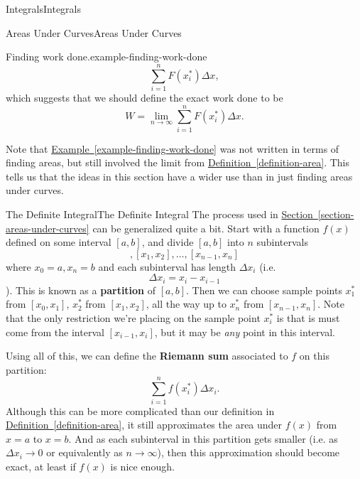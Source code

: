 \documentclass[10pt,]{book}
\newcommand{\terminology}[1]{\textbf{#1}}
\numberwithin{equation}{section}
\begin{document}
\begin{chapterptx}{Integrals}{}{Integrals}{}{}
\begin{sectionptx}{Areas Under Curves}{}{Areas Under Curves}{}{}
\begin{example}{Finding work done.}{example-finding-work-done}
\begin{equation*}
\sum_{i=1}^{n}F(x_{i}^{*})\Delta x,
\end{equation*}
which suggests that we should define the exact work done to be%
\begin{equation*}
W = \lim_{n\to\infty}\sum_{i=1}^{n}F(x_{i}^{*})\Delta x.
\end{equation*}
%
\end{example}
\hypertarget{p-424}{}%
Note that \hyperref[example-finding-work-done]{Example~\ref{example-finding-work-done}} was not written in terms of finding areas, but still involved the limit from \hyperref[definition-area]{Definition~\ref{definition-area}}. This tells us that the ideas in this section have a wider use than in just finding areas under curves.%
\end{sectionptx}
%
%
\typeout{************************************************}
\typeout{************************************************}
%
\begin{sectionptx}{The Definite Integral}{}{The Definite Integral}{}{}\label{section-the-definite-integral}
\hypertarget{p-425}{}%
The process used in \hyperref[section-areas-under-curves]{Section~\ref{section-areas-under-curves}} can be generalized quite a bit. Start with a function \(f(x)\) defined on some interval \([a,b]\), and divide \([a,b]\) into \(n\) subintervals%
\begin{equation*}
[x_{0},x_{1}], [x_{1},x_{2}],\ldots,[x_{n-1},x_{n}]
\end{equation*}
where \(x_{0} = a, x_{n} = b\) and each subinterval has length \(\Delta x_{i}\) (i.e.%
\begin{equation*}
\Delta x_{i} = x_{i} - x_{i-1}
\end{equation*}
). This is known as a \terminology{partition} of \([a,b]\). Then we can choose sample points \(x_{1}^{*}\) from \([x_{0},x_{1}]\), \(x_{2}^{*}\) from \([x_{1},x_{2}]\), all the way up to \(x_{n}^{*}\) from \([x_{n-1},x_{n}]\). Note that the only restriction we're placing on the sample point \(x_{i}^{*}\) is that is must come from the interval \([x_{i-1},x_{i}]\), but it may be \emph{any} point in this interval.%
\par
\hypertarget{p-426}{}%
Using all of this, we can define the \terminology{Riemann sum} associated to \(f\) on this partition:%
\begin{equation*}
\sum_{i=1}^{n}f(x_{i}^{*})\Delta x_{i}.
\end{equation*}
Although this can be more complicated than our definition in \hyperref[definition-area]{Definition~\ref{definition-area}}, it still approximates the area under \(f(x)\) from \(x=a\) to \(x=b\). And as each subinterval in this partition gets smaller (i.e. as \(\Delta x_{i}\to0\) or equivalently as \(n\to\infty\)), then this approximation should become exact, at least if \(f(x)\) is nice enough.%

\end{sectionptx}
\end{chapterptx}
\end{document}
